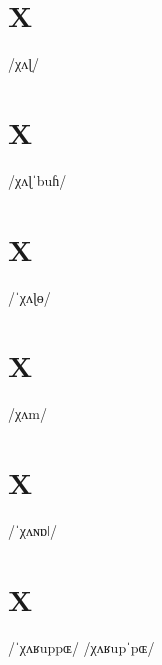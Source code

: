 \documentclass[10pt,a4paper,twoside]{book}
\begin{document}
\section*{X}

\begin{multicols}{3}
 {/χʌɭ/} {}
\end{multicols}

\section*{X}

\begin{multicols}{3}
 {/χʌɭˈbuɦ/} {}
\end{multicols}

\section*{X}

\begin{multicols}{3}
 {/ˈχʌɭɵ/} {}
\end{multicols}

\section*{X}

\begin{multicols}{3}
 {/χʌm/} {}
\end{multicols}

\section*{X}

\begin{multicols}{3}
 {/ˈχʌɴɒǀ/} {}
\end{multicols}

\section*{X}

\begin{multicols}{3}
 {/ˈχʌʁuppɶ/} {}
 {/χʌʁupˈpɶ/} {}
\end{multicols}
\end{document}
